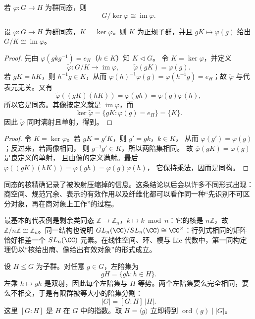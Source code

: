 \begin{theorem}[第一同构定理]
若 $\varphi:G\to H$ 为群同态，则
\begin{equation}
G/\ker\varphi\cong \operatorname{im}\varphi.
\label{eq:first-isomorphism-theorem}
\end{equation}
\end{theorem}

\begin{theorem}[第一同构定理]
设 $\varphi:G\to H$ 为群同态，$K=\ker\varphi$。则 $K$ 为正规子群，并且 $gK\mapsto\varphi(g)$ 给出 $G/K\cong\operatorname{im}\varphi$。
\end{theorem}
\begin{proof}
先由 $\varphi(gkg^{-1})=e_H$（$k\in K$）知 $K\triangleleft G$。
令 $K=\ker\varphi$，并定义
\[
\widetilde\varphi:G/K\longrightarrow\operatorname{im}\varphi,
\qquad \widetilde\varphi(gK)=\varphi(g).
\]
若 $gK=hK$，则 $h^{-1}g\in K$，从而
$\varphi(h)^{-1}\varphi(g)=\varphi(h^{-1}g)=e_H$；故
$\widetilde\varphi$ 与代表元无关。又有
\[
\widetilde\varphi((gK)(hK))
=\varphi(gh)
=\varphi(g)\varphi(h),
\]
所以它是同态。其像按定义就是 $\operatorname{im}\varphi$，而
\[
\ker\widetilde\varphi
=\{gK:\varphi(g)=e_H\}
=\{K\}.
\]
因此 $\widetilde\varphi$ 同时满射且单射，得到。
\end{proof}

\begin{proof}
令 $K=\ker\varphi$。若 $gK=g'K$，则 $g'=gk$，$k\in K$，
从而 $\varphi(g')=\varphi(g)$；反过来，若两像相同，
则 $g^{-1}g'\in K$，所以两陪集相同。
故 $\overline\varphi(gK)=\varphi(g)$ 是良定义的单射，
且由像的定义满射。最后
$\overline\varphi((gK)(hK))=\varphi(gh)=\varphi(g)\varphi(h)$，
它保持乘法，因而是同构。
\end{proof}

同态的核精确记录了被映射压缩掉的信息。这条结论以后会以许多不同形式出现：商空间、规范冗余、表示的有效作用以及纤维化都可以看作同一种“先识别不可区分对象，再在商对象上工作”的过程。

最基本的代表例是剩余类同态
$\mathbb Z\to\mathbb Z_n$，$k\mapsto k\bmod n$：它的核是
$n\mathbb Z$，故 $\mathbb Z/n\mathbb Z\cong\mathbb Z_n$。同一结构也说明
$GL_n(\CC)/SL_n(\CC)\cong\CC^\times$：行列式相同的矩阵恰好相差一个
$SL_n(\CC)$ 元素。在线性空间、环、模与 Lie 代数中，第一同构定理仍以“核给出商、像给出有效对象”的形式成立。

设 $H\le G$ 为子群。对任意 $g\in G$，左陪集为
\[
gH=\{gh:h\in H\}.
\]
左乘 $h\mapsto gh$ 是双射，因此每个左陪集与 $H$ 等势。两个左陪集要么完全相同，要么不相交，于是有限群被等大小的陪集分割：
\begin{equation*}|G|=[G:H]\,|H|.\end{equation*}
这里 $[G:H]$ 是 $H$ 在 $G$ 中的指数。取 $H=\langle g\rangle$ 立即得到 $\operatorname{ord}(g)\mid |G|$。

